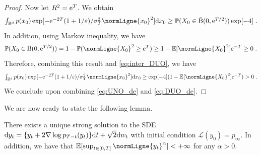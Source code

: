 \begin{proof}
    Now let $R^2 = \mathrm{e}^T$. We obtain
    \begin{equation}
      \textstyle{
        \int_{\rset^d} p(x_0) \exp[-\rme^{-2T}(1+1/\vareps)/\sigma_T^2\normLigne{x_0}^2] \rmd x_0 } \geq \probaLigne{X_0 \in \cball{0}{\rme^{T/2}}} \exp[-4] \eqsp . 
    \end{equation}
    In addition, using Markov inequality, we have
    \begin{equation}
      \probaLigne{X_0 \in \cball{0}{\rme^{T/2}}} = 1 - \probaLigne{\normLigne{X_0}^2 \geq \rme^T} \geq 1 - \expeLigne{\normLigne{X_0}^2} \rme^{-T} \geq 0 \eqsp . 
    \end{equation}
    Therefore, combining this result and \eqref{eq:inter_DUO}, we have
    \begin{equation}
      \label{eq:DUO_de}
      \textstyle{
        \int_{\rset^d} p(x_0) \exp[-\rme^{-2T}(1+1/\vareps)/\sigma_T^2\normLigne{x_0}^2] \rmd x_0 } \geq \exp[-4] (1 - \expeLigne{\normLigne{X_0}^2} \rme^{-T}) > 0 \eqsp . 
    \end{equation}
    We conclude upon combining \eqref{eq:UNO_de} and \eqref{eq:DUO_de}.
\end{proof}


We are now ready to state the following lemma.

\begin{lemma}
  \label{lemma:strong_solution_backward}
  There exists a unique strong solution to the SDE
  $\mathrm{d} y_t = \{ y_t + 2 \nabla \log p_{T-t}(y_t)\} \mathrm{d} t + \sqrt{2}
  \mathrm{d} w_t$ with initial condition $\mathcal{L}(y_0) = p_\infty$. In
  addition, we have that
  $\expeLigne{\sup_{t \in \ccint{0,T}}\normLigne{y_t}^\alpha}<+\infty$ for any 
  $\alpha >0$.
\end{lemma}

